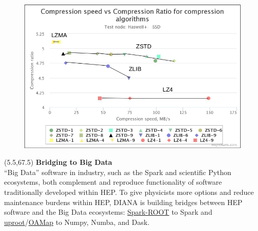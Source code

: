 \documentclass[final]{beamer}
\begin{document}
\begin{frame}{}
\begin{textblock}{12.5}
\begin{figure}[tbph]
\vspace{0.5 cm}
\includegraphics[width=\textwidth]{images/compr.png}
\end{figure}
\end{textblock}


\begin{textblock}{22.5}(5.5,67.5)
\textcolor{mybluelabel}{\bf Bridging to Big Data} \\
``Big Data'' software in industry, such as the Spark and scientific Python ecosystems, both complement
and reproduce functionality of software traditionally developed within HEP. To give physicists more
options and reduce maintenance burdens within HEP, DIANA is building bridges between HEP software and
the Big Data ecosystems: \href{https://github.com/diana-hep/spark-root}{Spark-ROOT} to Spark and
\href{https://github.com/scikit-hep/uproot}{uproot}/\href{https://github.com/diana-hep/oamap}{OAMap}
to Numpy, Numba, and Dask.
\end{textblock}


\end{frame}
\end{document}
